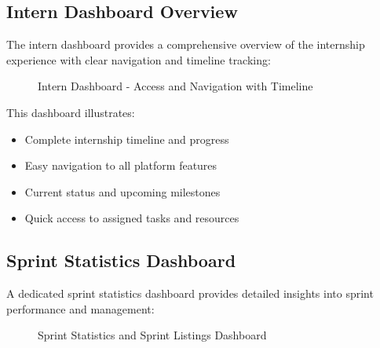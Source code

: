 \subsection{Intern Dashboard Overview}
\noindent
The intern dashboard provides a comprehensive overview of the internship experience with clear navigation and timeline tracking:

\begin{figure}[H]
    \centering
    \caption{Intern Dashboard - Access and Navigation with Timeline}
    \label{fig:intern_dashboard}
\end{figure}

This dashboard illustrates:
\begin{itemize}
    \item Complete internship timeline and progress
    \item Easy navigation to all platform features
    \item Current status and upcoming milestones
    \item Quick access to assigned tasks and resources
\end{itemize}

\subsection{Sprint Statistics Dashboard}
\noindent
A dedicated sprint statistics dashboard provides detailed insights into sprint performance and management:

\begin{figure}[H]
    \centering
    \caption{Sprint Statistics and Sprint Listings Dashboard}
    \label{fig:sprint_dashboard}
\end{figure}

